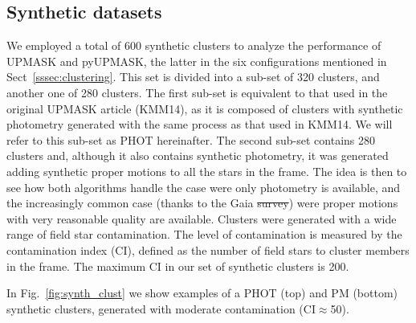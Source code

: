 \documentclass[draft]{aa}
\providecommand{\DIFaddtex}[1]{{\protect\color{blue}\uwave{#1}}} %
\providecommand{\DIFdeltex}[1]{{\protect\color{red}\sout{#1}}}                      %
\providecommand{\DIFaddbegin}{} %
\providecommand{\DIFaddend}{} %
\providecommand{\DIFdelbegin}{} %
\providecommand{\DIFdelend}{} %
\providecommand{\DIFadd}[1]{\texorpdfstring{\DIFaddtex{#1}}{#1}} %
\providecommand{\DIFdel}[1]{\texorpdfstring{\DIFdeltex{#1}}{}} %
\newcommand{\DIFscaledelfig}{0.5}
\newlength{\DIFdelgraphicswidth} %
\newlength{\DIFdelgraphicsheight} %
\newcommand{\DIFaddincludegraphics}[2][]{{\color{blue}\fbox{\DIFOincludegraphics[#1]{#2}}}} %
\newcommand{\DIFdelincludegraphics}[2][]{%
\sbox{\DIFdelgraphicsbox}{\DIFOincludegraphics[#1]{#2}}%
\settoboxwidth{\DIFdelgraphicswidth}{\DIFdelgraphicsbox} %
\settoboxtotalheight{\DIFdelgraphicsheight}{\DIFdelgraphicsbox} %
\scalebox{\DIFscaledelfig}{%
\parbox[b]{\DIFdelgraphicswidth}{\usebox{\DIFdelgraphicsbox}\\[-\baselineskip] \rule{\DIFdelgraphicswidth}{0em}}\llap{\resizebox{\DIFdelgraphicswidth}{\DIFdelgraphicsheight}{%
\setlength{\unitlength}{\DIFdelgraphicswidth}%
\begin{picture}(1,1)%
\thicklines\linethickness{2pt} %
{\color[rgb]{1,0,0}\put(0,0){\framebox(1,1){}}}%
{\color[rgb]{1,0,0}\put(0,0){\line( 1,1){1}}}%
{\color[rgb]{1,0,0}\put(0,1){\line(1,-1){1}}}%
\end{picture}%
}\hspace*{3pt}}} %
} %
\DeclareRobustCommand{\DIFaddbegin}{\DIFOaddbegin \let\includegraphics\DIFaddincludegraphics} %
\DeclareRobustCommand{\DIFaddend}{\DIFOaddend \let\includegraphics\DIFOincludegraphics} %
\DeclareRobustCommand{\DIFdelbegin}{\DIFOdelbegin \let\includegraphics\DIFdelincludegraphics} %
\DeclareRobustCommand{\DIFdelend}{\DIFOaddend \let\includegraphics\DIFOincludegraphics} %
\begin{document}
\subsection{Synthetic datasets}
 \label{ssec:synthetic}

 We employed a total of 600 synthetic clusters to analyze the performance of
 UPMASK and pyUPMASK, the latter in the six configurations mentioned in
 Sect~\ref{sssec:clustering}. This set is divided into a sub-set of 320
 clusters, and another one of 280 clusters. The first sub-set is equivalent to
 that used in the original UPMASK article (KMM14), as it is composed of
 clusters with synthetic photometry generated with the same process as that
 used in KMM14. We will refer to this sub-set as PHOT hereinafter.
 The second sub-set contains 280 clusters and, although it also contains
 synthetic photometry, it was generated adding synthetic proper motions to all
 the stars in the frame.
 The idea is then to see how both algorithms handle the case were only
 photometry is available, and the increasingly common case (thanks to the Gaia
 \DIFdelbegin \DIFdel{survey}\DIFdelend \DIFaddbegin \DIFadd{mission}\DIFaddend ) were proper motions with very reasonable quality are available.
 Clusters were generated with a wide range of field star contamination.
 The level of contamination is measured by the contamination index (CI),
 defined as the number of field stars to cluster members in the frame. The
 maximum CI in our set of synthetic clusters is 200.

 In Fig.~\ref{fig:synth_clust} we show examples of a PHOT (top) and PM
 (bottom) synthetic clusters, generated with moderate contamination 
 (CI$\approx$50).
\end{document}
